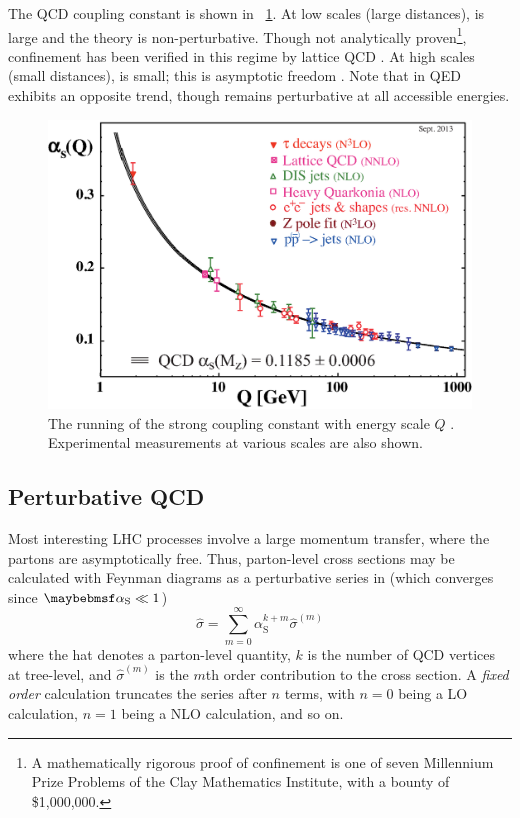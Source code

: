 The \ac{QCD} coupling constant \alphaS is shown in \Figure~\ref{fig:qcd:alpha_s}. At low 
scales (large distances), \alphaS is large and the theory is non-perturbative. 
Though not analytically proven\footnote{
	A mathematically rigorous proof of confinement is one of seven Millennium Prize 
	Problems of the Clay Mathematics Institute, with a bounty of \$1,000,000.
}, confinement has been verified in this regime by lattice \ac{QCD} \cite{Wilson:1974}. 
At high scales (small distances), \alphaS is small; this is asymptotic freedom 
\cite{Gross:1973,Politzer:1973}. Note that \alphaEM in \acs{QED} exhibits an opposite 
trend, though remains perturbative at all accessible energies.
\begin{figure}
	\includegraphics[width=\mediumfigwidth]{tex/tools/alpha_s}
	\caption{The running of the strong coupling constant \alphaS with energy scale $Q$ 
	\cite{PDG:2012}. Experimental measurements at various scales are also shown.}
	\label{fig:qcd:alpha_s}
\end{figure}



\subsection{Perturbative QCD}
\label{sec:qcd:pqcd}

Most interesting \acs{LHC} processes involve a large momentum transfer, where the partons 
are asymptotically free. Thus, parton-level cross sections may be calculated with Feynman 
diagrams as a perturbative series in \alphaS (which converges since $\alphaS \ll 1$)
\begin{equation}
	\hat{\sigma} = \sum\limits_{m=0}^{\infty} \alpha_{\text{S}}^{k+m} \hat{\sigma}^{(m)}
	\label{eq:qcd:partonic_xs}
\end{equation}
where the hat denotes a parton-level quantity, $k$ is the number of \ac{QCD} vertices at 
tree-level, and $\hat{\sigma}^{(m)}$ is the $m$th order contribution to the cross section.
A \textit{fixed order} calculation truncates the series after $n$ terms, with $n=0$ being 
a \ac{LO} calculation, $n=1$ being a \ac{NLO} calculation, and so on.

